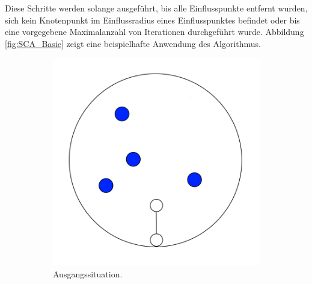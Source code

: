 Diese Schritte werden solange ausgeführt, bis alle Einflusspunkte entfernt wurden, sich kein Knotenpunkt im Einflussradius eines Einflusspunktes befindet oder bis eine vorgegebene Maximalanzahl von Iterationen durchgeführt wurde. \cite[S.2]{SpaceColonizationAlgorithm:07} Abbildung \ref{fig:SCA_Basic} zeigt eine beispielhafte Anwendung des Algorithmus.

\begin{figure} [hbtp]
	\centering
	\begin{subfigure}[t]{.31\textwidth}
		\centering
		\includegraphics[width=\linewidth]{images/SCA_Basic1.png}
		\caption{ Ausgangssituation. }
		\label{subfig:SCA_Basic1}
	\end{subfigure}
	\hspace{.01\textwidth}
	\begin{subfigure}[t]{.31\textwidth}
		\centering

\end{subfigure}
\end{figure}
